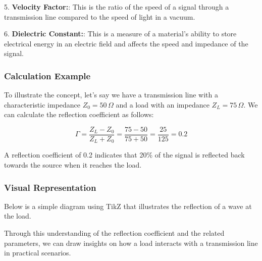 5. \textbf{Velocity Factor:}: This is the ratio of the speed of a signal through a transmission line compared to the speed of light in a vacuum.

6. \textbf{Dielectric Constant:}: This is a measure of a material's ability to store electrical energy in an electric field and affects the speed and impedance of the signal.

\subsubsection{Calculation Example}

To illustrate the concept, let's say we have a transmission line with a characteristic impedance \( Z_0 = 50 \, \Omega \) and a load with an impedance \( Z_L = 75 \, \Omega \). We can calculate the reflection coefficient as follows:

\[
\Gamma = \frac{Z_L - Z_0}{Z_L + Z_0} = \frac{75 - 50}{75 + 50} = \frac{25}{125} = 0.2
\]

A reflection coefficient of 0.2 indicates that 20\% of the signal is reflected back towards the source when it reaches the load.

\subsubsection{Visual Representation}

Below is a simple diagram using TikZ that illustrates the reflection of a wave at the load.

\begin{center}
\end{center}

Through this understanding of the reflection coefficient and the related parameters, we can draw insights on how a load interacts with a transmission line in practical scenarios.
